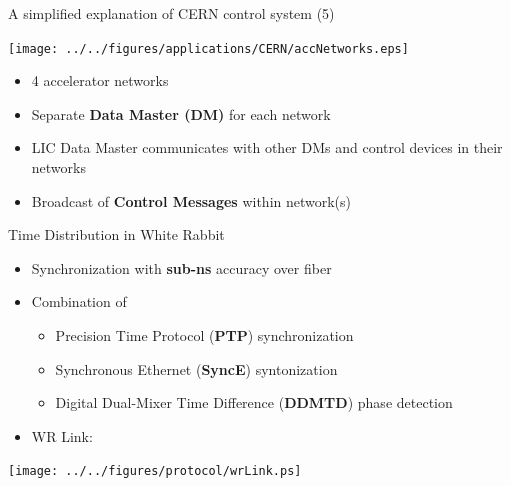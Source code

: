 \documentclass[compress,red]{beamer}
\begin{document}
\begin{frame}{A simplified explanation of CERN control system (5)}

      \begin{center}
      \texttt{[image: ../../figures/applications/CERN/accNetworks.eps]}
      \end{center}

  \begin{itemize}
    \item 4 accelerator networks
    \item Separate {\bf Data Master (DM)} for each network
    \item \textcolor{green!90}{LIC Data Master} communicates with other DMs and control devices in their networks
    \item Broadcast of {\bf Control Messages} within network(s)
  \end{itemize}

\end{frame}

\begin{frame}{Time Distribution in White Rabbit}

  \begin{itemize}
    \item Synchronization with {\bf sub-ns} accuracy over fiber
    \item Combination of
	\begin{itemize}
	  \item Precision Time Protocol ({\bf PTP}) synchronization
	  \item Synchronous Ethernet ({\bf SyncE}) syntonization
	  \item Digital Dual-Mixer Time Difference ({\bf DDMTD}) phase detection
	\end{itemize}
    \item WR Link:
  \end{itemize}

  \begin{center}
  \texttt{[image: ../../figures/protocol/wrLink.ps]}
  \end{center}

\end{frame}
\end{document}
